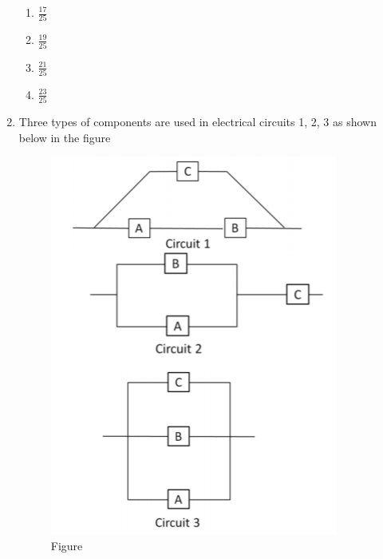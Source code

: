 \begin{enumerate}[label=\thesection.\arabic*.,ref=\thesection.\theenumi]
\begin{enumerate}
\item $ \frac{17}{25}$\\
\item $\frac{19}{25}$\\
\item $ \frac{21}{25}$\\
\item $\frac{23}{25}$

\end{enumerate}
%
\solution

%
\item Three types of components are used in electrical circuits 1, 2, 3 as shown below in the figure
\begin{figure}[h]
    \centering
    \includegraphics[width=\columnwidth]{solutions/2016/june/118/Figures/circuits.png}
    \caption{Figure}
    \label{fig:fig_label}
\end{figure}
%
\solution

\end{enumerate}